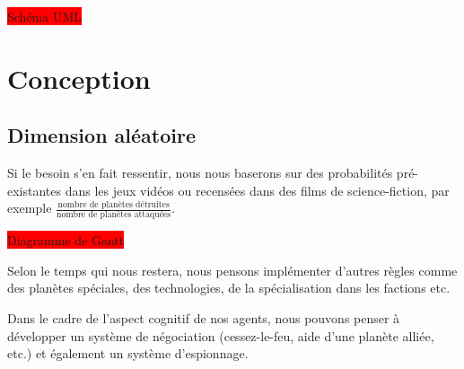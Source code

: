 \documentclass{article}
\newcommand{\TODO}[1]{\colorbox{red}{#1}}
\begin{document}
    \TODO{Schéma UML}

  \section{Conception}
    \subsection{Dimension aléatoire}
      Si le besoin s'en fait ressentir, nous nous baserons sur des probabilités pré-existantes dans les jeux vidéos ou recensées dans des films de science-fiction, par exemple $\displaystyle \frac{\text{nombre de planètes détruites}}{\text{nombre de planètes attaquées}} $.
    

\TODO{Diagramme de Gantt}

    Selon le temps qui nous restera, nous pensons implémenter d'autres règles comme des planètes spéciales, des technologies, de la spécialisation dans les factions etc.

    Dans le cadre de l'aspect cognitif de nos agents, nous pouvons penser à développer un système de négociation (cessez-le-feu, aide d'une planète alliée, etc.) et également un système d'espionnage.
\end{document}
